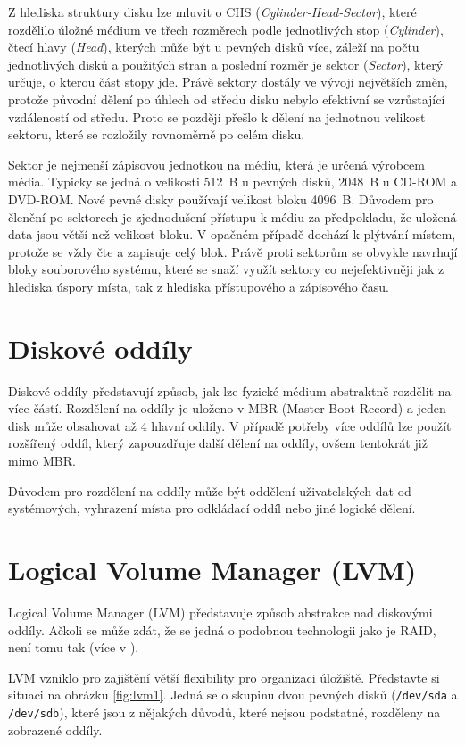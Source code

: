 Z hlediska struktury disku lze mluvit o CHS (\textit{Cylinder-Head-Sector}), které rozdělilo úložné médium ve třech rozměrech podle jednotlivých stop (\textit{Cylinder}), čtecí hlavy (\textit{Head}), kterých může být u pevných disků více, záleží na počtu jednotlivých disků a použitých stran a poslední rozměr je sektor (\textit{Sector}), který určuje, o kterou část stopy jde. Právě sektory dostály ve vývoji největších změn, protože původní dělení po úhlech od středu disku nebylo efektivní se vzrůstající vzdáleností od středu. Proto se později přešlo k dělení na jednotnou velikost sektoru, které se rozložily rovnoměrně po celém disku.

Sektor je nejmenší zápisovou jednotkou na médiu, která je určená výrobcem média. Typicky se jedná o velikosti 512~B u pevných disků, 2048~B u CD-ROM a DVD-ROM. Nové pevné disky používají velikost bloku 4096~B. Důvodem pro členění po sektorech je zjednodušení přístupu k médiu za předpokladu, že uložená data jsou větší než velikost bloku. V opačném případě dochází k plýtvání místem, protože se vždy čte a zapisuje celý blok. Právě proti sektorům se obvykle navrhují bloky souborového systému, které se snaží využít sektory co nejefektivněji jak z hlediska úspory místa, tak z hlediska přístupového a zápisového času.

\section{Diskové oddíly}
Diskové oddíly představují způsob, jak lze fyzické médium abstraktně rozdělit na více částí. Rozdělení na oddíly je uloženo v MBR (Master Boot Record) a jeden disk může obsahovat až 4 hlavní oddíly. V případě potřeby více oddílů lze použít rozšířený oddíl, který zapouzdřuje další dělení na oddíly, ovšem tentokrát již mimo MBR.

Důvodem pro rozdělení na oddíly může být oddělení uživatelských dat od systémových, vyhrazení místa pro odkládací oddíl nebo jiné logické dělení. 

\section{Logical Volume Manager (LVM)}
Logical Volume Manager (LVM) představuje způsob abstrakce nad diskovými oddíly. Ačkoli se může zdát, že se jedná o podobnou technologii jako je RAID, není tomu tak (více v \cite{arch-lvm}).

LVM vzniklo pro zajištění větší flexibility pro organizaci úložiště. Představte si situaci na obrázku \ref{fig:lvm1}. Jedná se o skupinu dvou pevných disků (\texttt{/dev/sda} a \texttt{/dev/sdb}), které jsou z nějakých důvodů, které nejsou podstatné, rozděleny na zobrazené oddíly.

